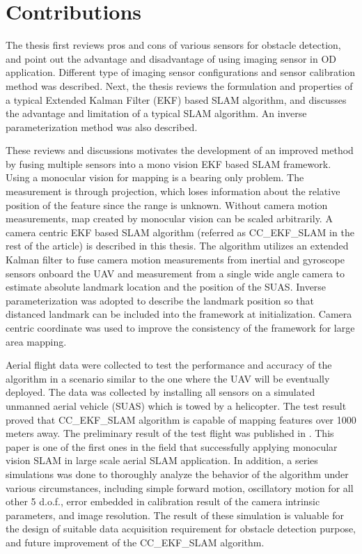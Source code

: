 \section{Contributions}\label{section:Contribution}
The thesis first reviews pros and cons of various sensors for obstacle
detection, and point out the advantage and disadvantage of using
imaging sensor in OD application. Different type of imaging sensor
configurations and sensor calibration method was described. Next, the
thesis reviews the formulation and properties of a typical Extended
Kalman Filter (EKF) based SLAM algorithm, and discusses the advantage
and limitation of a typical SLAM algorithm. An inverse
parameterization method was also described. 

These reviews and discussions motivates the development of an improved
method by fusing multiple sensors into a mono vision EKF based SLAM
framework. Using a monocular vision for mapping is a bearing only
problem. The measurement is through projection, which loses
information about the relative position of the feature since the range
is unknown. Without camera motion measurements, map created by
monocular vision can be scaled arbitrarily. A camera centric EKF based
SLAM algorithm (referred as CC\_EKF\_SLAM in the rest of the article)
is described in this thesis. The algorithm utilizes an extended Kalman
filter to fuse camera motion measurements from inertial and gyroscope
sensors onboard the UAV and measurement from a single wide angle
camera to estimate absolute landmark location and the position of the
SUAS. Inverse parameterization was adopted to describe the landmark
position so that distanced landmark can be included into the framework
at initialization. Camera centric coordinate was used to improve the
consistency of the framework for large area mapping. 

Aerial flight data were collected to test the performance and accuracy
of the algorithm in a scenario similar to the one where the UAV will
be eventually deployed. The data was collected by installing all
sensors on a simulated unmanned aerial vehicle (SUAS) which is towed
by a helicopter. The test result proved that CC\_EKF\_SLAM algorithm
is capable of mapping features over 1000 meters away. The preliminary
result of the test flight was published in \cite{zhang_obstacle_2012}.
This paper is one of the first ones in the field that successfully
applying monocular vision SLAM in large scale aerial SLAM application.
In addition, a series simulations was done to thoroughly analyze the
behavior of the algorithm under various circumstances, including
simple forward motion, oscillatory motion for all other 5 d.o.f.,
error embedded in calibration result of the camera intrinsic
parameters, and image resolution. The result of these simulation is
valuable for the design of suitable data acquisition requirement for
obstacle detection purpose, and future improvement of the
CC\_EKF\_SLAM algorithm.

